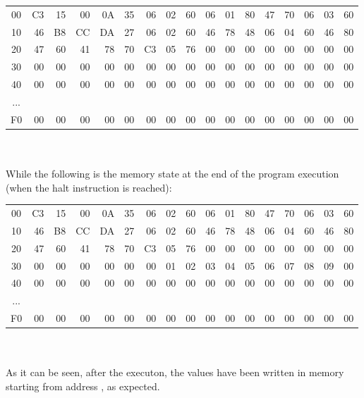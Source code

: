 \noindent\begin{tabular}{ |c| r*{15}{@{ }r}| }
    
        00 & C3 & 15 & 00 & 0A & 35 & 06 & 02 & 60 & 06 & 01 & 80 & 47 & 70 & 06 & 03 & 60 \\ 
        10 & 46 & B8 & CC & DA & 27 & 06 & 02 & 60 & 46 & 78 & 48 & 06 & 04 & 60 & 46 & 80  \\
        20 & 47 & 60 & 41 & 78 & 70 & C3 & 05 & 76 & 00 & 00 & 00 & 00 & 00 & 00 & 00 & 00  \\
        30 & 00 & 00 & 00 & 00 & 00 & 00 & 00 & 00 & 00 & 00 & 00 & 00 & 00 & 00 & 00 & 00\\
        40 & 00 & 00 & 00 & 00 & 00 & 00 & 00 & 00 & 00 & 00 & 00 & 00 & 00 & 00 & 00 & 00\\
    ... \\
        F0 & 00 & 00 & 00 & 00 & 00 & 00 & 00 & 00 & 00 & 00 & 00 & 00 & 00 & 00 & 00 & 00\\
\end{tabular}
\\ \\

While the following is the memory state at the end of the program execution (when the halt  instruction is reached):
\\

\noindent\begin{tabular}{ |c| r*{15}{@{ }r}| }
    
    00 & C3 & 15 & 00 & 0A & 35 & 06 & 02 & 60 & 06 & 01 & 80 & 47 & 70 & 06 & 03 & 60 \\ 
    10 & 46 & B8 & CC & DA & 27 & 06 & 02 & 60 & 46 & 78 & 48 & 06 & 04 & 60 & 46 & 80  \\
    20 & 47 & 60 & 41 & 78 & 70 & C3 & 05 & 76 & 00 & 00 & 00 & 00 & 00 & 00 & 00 & 00  \\
    30 & 00 & 00 & 00 & 00 & 00 & 00 & 01 & 02 & 03 & 04 & 05 & 06 & 07 & 08 & 09 & 00\\
    40 & 00 & 00 & 00 & 00 & 00 & 00 & 00 & 00 & 00 & 00 & 00 & 00 & 00 & 00 & 00 & 00\\
... \\
    F0 & 00 & 00 & 00 & 00 & 00 & 00 & 00 & 00 & 00 & 00 & 00 & 00 & 00 & 00 & 00 & 00\\
\end{tabular}
\\
\\
As it can be seen, after the executon, the values  have been written in memory starting from address , as expected.

